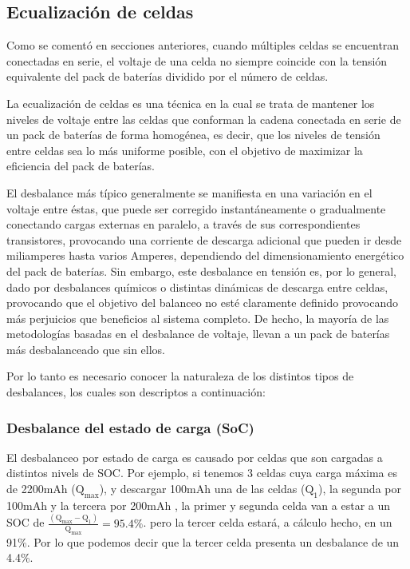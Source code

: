 \documentclass[10pt,a4paper]{article}
\begin{document}
\subsection{Ecualización de celdas}
	
	\noindent Como se comentó en secciones anteriores, cuando múltiples
celdas se encuentran conectadas en serie, el voltaje de una celda no siempre
coincide con la tensión equivalente del pack de baterías dividido por el número
de celdas. 
	
	\noindent La ecualización de celdas es una técnica en la cual se trata
de mantener los niveles de voltaje entre las celdas que conforman la cadena
conectada en serie de un pack de baterías de forma homogénea, es decir, que los
niveles de tensión entre celdas sea lo más uniforme posible, con el objetivo de
maximizar la eficiencia del pack de baterías.
	
	\noindent El desbalance más típico generalmente se manifiesta en una variación en el voltaje entre éstas, que puede ser corregido instantáneamente o
gradualmente conectando cargas externas en paralelo, a través de sus
correspondientes transistores, provocando una corriente de descarga adicional
que pueden ir desde miliamperes hasta varios Amperes, dependiendo del
dimensionamiento energético del pack de baterías. Sin embargo, este desbalance
en tensión es, por lo general, dado por desbalances químicos o distintas
dinámicas de descarga entre celdas, provocando que el objetivo del balanceo no
esté claramente definido provocando más perjuicios que beneficios al sistema
completo. De hecho, la mayoría de las metodologías basadas en el desbalance de
voltaje, llevan a un pack de baterías más desbalanceado que sin ellos.
	
	\noindent Por lo tanto es necesario conocer la naturaleza de los distintos tipos de desbalances, los cuales son descriptos a continuación:
	
	\subsubsection{Desbalance del estado de carga (SoC)}
	
	\noindent El desbalanceo por estado de carga es causado por celdas que son cargadas a distintos nivels de \acrshort{SOC}. Por ejemplo, si tenemos 3 celdas cuya carga máxima es de 2200mAh ($\mathrm{Q_{max}}$), y descargar 100mAh una de las celdas ($\mathrm{Q_1}$), la segunda por 100mAh y la tercera por 200mAh , la primer y segunda celda van a estar a un \acrshort{SOC} de $\mathrm{\frac{(Q_{max} - Q_1)}{Q_{max}} = 95.4\%}$. pero la tercer celda estará, a cálculo hecho, en un 91\%. Por lo que podemos decir que la tercer celda presenta un desbalance de un 4.4\%. 
\end{document}
